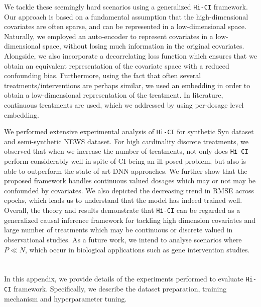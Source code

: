 \documentclass[twoside,11pt]{article}
\begin{document}
We tackle these seemingly hard scenarios using a generalized \texttt{Hi-CI} framework. Our approach is based on a fundamental assumption that the high-dimensional covariates are often sparse, and can be represented in a low-dimensional space. Naturally, we employed an auto-encoder to represent covariates in a low-dimensional space, without losing much information in the original covariates. Alongside, we also incorporate a decorrelating loss function which ensures that we obtain an equivalent representation of the covariate space with a reduced confounding bias. Furthermore, using the fact that often several treatments/interventions are perhaps similar, we used an embedding in order to obtain a low-dimensional representation of the treatment. In literature, continuous treatments are used, which we addressed by using per-dosage level embedding. 

We performed extensive experimental analysis of \texttt{Hi-CI} for synthetic \textsf{Syn} dataset and semi-synthetic \textsf{NEWS} dataset. For high cardinality discrete treatments, we observed that when we increase the  number of treatments, not only does \texttt{Hi-CI} perform considerably well in spite of CI being an ill-posed problem, but also is able to outperform the state of art DNN approaches. We further show that the proposed framework handles continuous valued dosages which may or not may be confounded by covariates. We also depicted the decreasing trend in RMSE across epochs, which leads us to understand that the model has indeed trained well. Overall, the theory and results demonstrate that \texttt{Hi-CI} can be regarded as a generalized causal inference framework for tackling high dimension covariates and large number of treatments which may be continuous or discrete valued in observational studies. As a future work, we intend to analyse scenarios where $P \ll N$, which occur in biological applications such as gene intervention studies.


\newpage

\appendix
\section{}
In this appendix, we provide details of the experiments performed to evaluate \texttt{Hi-CI} framework. Specifically, we describe the dataset preparation, training mechanism and hyperparameter tuning.
\end{document}
